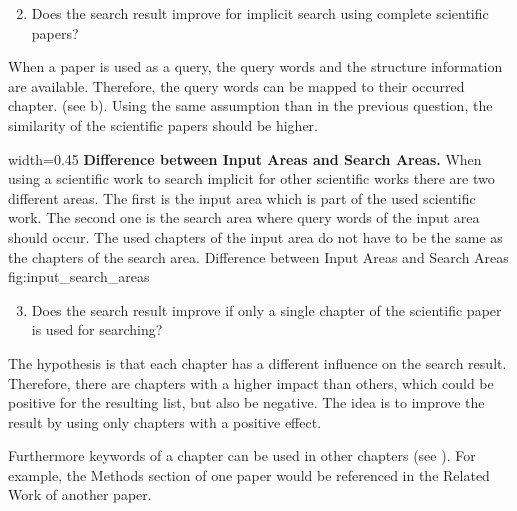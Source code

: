\begin{enumerate}
  \setcounter{enumi}{1}
  \item Does the search result improve for implicit search using complete scientific papers?
\end{enumerate}

When a paper is used as a query, the query words and the structure information are available. Therefore, the query words can be mapped to their occurred chapter. (see  b). Using the same assumption than in the previous question, the similarity of the scientific papers should be higher.

      {width=0.45\textwidth}
      {\textbf{Difference between Input Areas and Search Areas.} When using a scientific work to search implicit for other scientific works there are two different areas. The first is the input area which is part of the used scientific work. The second one is the search area where query words of the input area should occur. The used chapters of the input area do not have to be the same as the chapters of the search area.}
      {Difference between Input Areas and Search Areas}
      {fig:input_search_areas}

\begin{enumerate}
  \setcounter{enumi}{2}
  \item Does the search result improve if only a single chapter of the scientific paper is used for searching?
\end{enumerate}

The hypothesis is that each chapter has a different influence on the search result. Therefore, there are chapters with a higher impact than others, which could be positive for the resulting list, but also be negative. The idea is to improve the result by using only chapters with a positive effect.

Furthermore keywords of a chapter can be used in other chapters (see ). For example, the Methods section of one paper would be referenced in the Related Work of another paper.
